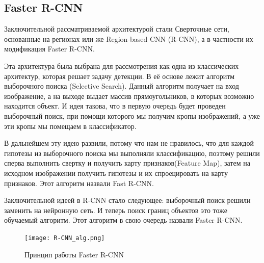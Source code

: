 \documentclass[../document.tex]{subfiles}
\begin{document}
	\subsection{Faster R-CNN}
		\par Заключительной рассматриваемой архитектурой стали Сверточные сети, основанные на регионах
 или же Region-based CNN (R-CNN), а в частности их модификация Faster R-CNN.
 		\par Эта архитектура была выбрана для рассмотрения как одна из классических архитектур, которая решает задачу детекции. В её основе лежит алгоритм выборочного поиска (Selective Search). Данный алгоритм получает на вход изображение, а на выходе выдает массив прямоугольников, в которых возможно находится объект. И идея такова, что в первую очередь будет проведен выборочный поиск, при помощи которого мы получим кропы изображений, а уже эти кропы мы помещаем в классификатор.
 		\par В дальнейшем эту идею развили, потому что нам не нравилось, что для каждой гипотезы из выборочного поиска мы выполняли классификацию, поэтому решили сперва выполнить свертку и получить карту признаков(Feature Map), затем на исходном изображении получить гипотезы и их спроецировать на карту признаков. Этот алгоритм назвали Fast R-CNN.
 		\par Заключительной идеей в R-CNN стало следующее: выборочный поиск решили заменить на нейронную сеть. И теперь поиск границ объектов это тоже обучаемый алгоритм. Этот алгоритм в свою очередь назвали Faster R-CNN.
 		
 		\begin{figure}[H]
 			\centering
 			\texttt{[image: R-CNN\_alg.png]}
 			\caption{Принцип работы Faster R-CNN}
 		\end{figure}
 	
\end{document}
